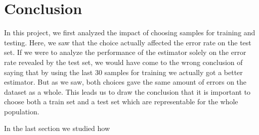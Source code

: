 \documentclass{article}
\begin{document}
\section{Conclusion}

In this project, we first analyzed the impact of choosing samples for training and testing.
Here, we saw that the choice actually affected the error rate on the test set. If we were to
analyze the performance of the estimator solely on the error rate revealed by the test set, we
would have come to the wrong conclusion of saying that by using the last 30 samples for training
we actually got a  better estimator. But as we saw, both choices gave the same amount of errors
on the dataset as a whole. This leads us to draw the conclusion that it is important to choose
both a train set and a test set which are  representable for the whole population.

In the last section we studied how

\printbibliography
\end{document}
